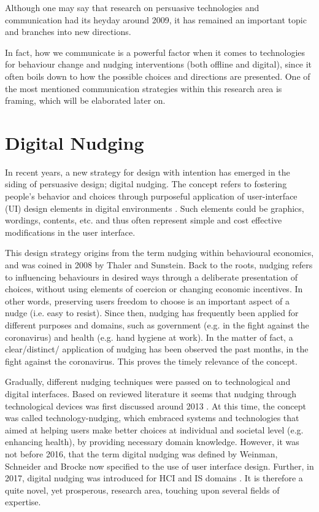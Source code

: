Although one may say that research on persuasive technologies and communication had its heyday around 2009, it has remained an important topic and  branches into new directions. 

In fact, how we communicate is a powerful factor when it comes to technologies for behaviour change and nudging interventions (both offline and digital), since it often boils down to how the possible choices and directions are presented. One of the most mentioned communication strategies within this research area is framing, which will be elaborated  later on.

\section{Digital Nudging}
In recent years, a new strategy for design with intention has emerged in the siding of persuasive design; digital nudging. The concept refers to fostering people's behavior and choices through purposeful application of user-interface (UI) design elements in digital environments \cite{mirsch_making_2018}. Such elements could be graphics, wordings, contents, etc. and thus often represent simple and cost effective modifications in the user interface.

This design strategy origins from the term nudging within behavioural economics, and was coined in 2008 by Thaler and Sunstein\cite{thaler_nudge-_2009}. 
Back to the roots, nudging refers to influencing behaviours in desired ways through a deliberate presentation of choices, without using elements of coercion or changing economic incentives. In other words, preserving users freedom to choose is an important aspect of a nudge (i.e. easy to resist). Since then, nudging has frequently been applied for different purposes and domains, such as government (e.g. in the fight against the coronavirus) and health (e.g. hand hygiene at work). In the matter of fact, a clear/distinct/ application of nudging has been observed the past months, in the fight against the coronavirus. This proves the timely relevance of the concept. 

Gradually, different nudging techniques were passed on to technological and digital interfaces. Based on reviewed literature it seems that nudging through technological devices was first discussed around 2013 
\cite{thomas_nudging_2013}.
At this time, the concept was called technology-nudging, which embraced systems and technologies that aimed at helping users make better choices at individual and societal level (e.g. enhancing health), by providing necessary domain knowledge. However, it was not before 2016, that the term digital nudging was defined by Weinman, Schneider and Brocke \cite{weinmann_digital_2016}
now specified to the use of user interface design. Further, in 2017, digital nudging was introduced for HCI and IS domains
\cite{schneider_digital_2018}.
It is therefore a quite novel, yet prosperous, research area, touching upon several fields of expertise.

